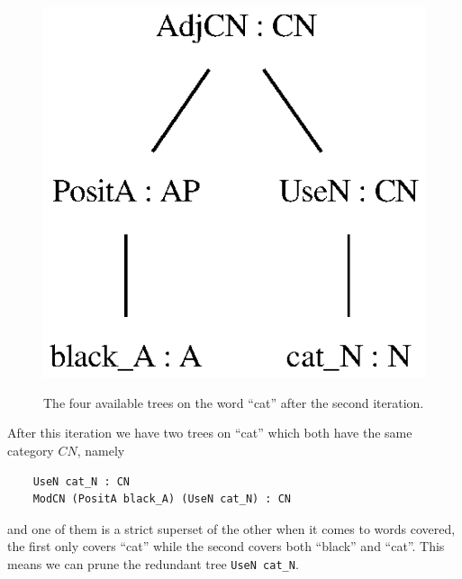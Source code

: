 \begin{figure}[H]
        {\includegraphics[scale=0.75]{thesis/figure/black_cats/black_cat_CN_gf.eps}}
    \caption{The four available trees on the word ``cat'' after the second iteration.}\label{fig:cat iter 2}
\end{figure}

After this iteration we have two trees on ``cat'' which both have the same category $CN$, namely
\begin{lstlisting}
    UseN cat_N : CN
    ModCN (PositA black_A) (UseN cat_N) : CN
\end{lstlisting}
and one of them is a strict superset of the other when it comes to words covered, the first only covers ``cat'' while the second covers both ``black'' and ``cat''. This means we can prune the redundant tree \lstinline{UseN cat_N}.


